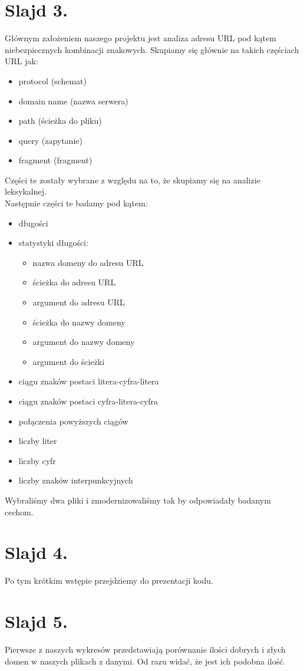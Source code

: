 \documentclass{article}
\begin{document}
\section{Slajd 3.}
{
	Głównym założeniem naszego projektu jest analiza adresu URL pod kątem niebezpiecznych kombinacji znakowych. Skupiamy się głównie na takich częściach URL jak:
	\begin{itemize}
		\item protocol (schemat)
		\item domain name (nazwa serwera)
		\item path (ścieżka do pliku)
		\item query (zapytanie)
		\item fragment (fragment)
	\end{itemize}
	Części te zostały wybrane z względu na to, że skupiamy się na analizie leksykalnej.\\
	Następnie części te badamy pod kątem:
	\begin{itemize}
		\item długości
		\item statystyki długości:
			\begin{itemize}
				\item nazwa domeny do adresu URL
				\item ścieżka do adresu URL
				\item argument do adresu URL
				\item ścieżka do nazwy domeny
				\item argument do nazwy domeny
				\item argument do ścieżki
			\end{itemize}
		\item ciągu znaków postaci litera-cyfra-litera
		\item ciągu znaków postaci cyfra-litera-cyfra
		\item połączenia powyższych ciągów
		\item liczby liter
		\item liczby cyfr
		\item liczby znaków interpunkcyjnych
	\end{itemize}
	Wybraliśmy dwa pliki i zmodernizowaliśmy tak by odpowiadały badanym cechom.
}
\section{Slajd 4.}
{
	Po tym krótkim wstępie przejdziemy do prezentacji kodu.
}
\section{Slajd 5.}
{
	Pierwsze z naszych wykresów przedstawiają porównanie ilości dobrych i złych domen w naszych plikach z danymi. Od razu widać, że jest ich podobna ilość.
}
\end{document}
